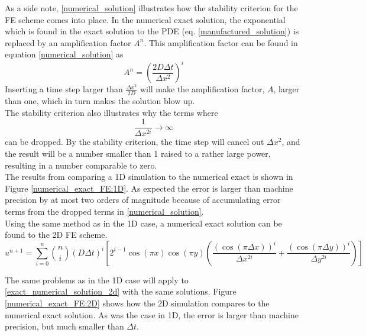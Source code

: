 As a side note, \eqref{numerical_solution} illustrates how the stability criterion for the FE scheme comes into place. 
In the numerical exact solution, the exponential which is found in the exact solution to the PDE (eq. \ref{manufactured_solution}) is replaced by an amplification factor $A^n$.
This amplification factor can be found in equation \eqref{numerical_solution} as 
\begin{equation}
A^n = \left(\frac{2D\Delta t}{\Delta x^2}\right)^i
\end{equation}
Inserting a time step larger than $\frac{\Delta x^2}{2D}$ will make the amplification factor, $A$, larger than one, which in turn makes the solution blow up. \\

\noindent The stability criterion also illustrates why the terms where 
$$ \frac{1}{\Delta x^{2i}} \to \infty$$
 can be dropped. 
 By the stability criterion, the time step will cancel out $\Delta x^2$, and the result will be a number smaller than 1 raised to a rather large power, resulting in a number comparable to zero.\\
 
 The results from comparing a 1D simulation to the numerical exact is shown in Figure \ref{numerical_exact_FE:1D}. 
 As expected the error is larger than machine precision by at most two orders of magnitude because of accumulating error terms from the dropped terms in \eqref{numerical_solution}.\\
 
\noindent Using the same method as in the 1D case, a numerical exact solution can be found to the 2D FE scheme. 
 \begin{equation}\label{exact_numerical_solution_2d}
 u^{n+1} = \sum\limits^n_{i=0}{n\choose i}\left(D\Delta t\right)^i\left[2^{i-1}\cos(\pi x)\cos(\pi y)\left(\frac{(\cos(\pi\Delta x))^i}{\Delta x^{2i}} +\frac{(\cos(\pi\Delta y))^i}{\Delta y^{2i}}\right)\right]
\end{equation}

The same problems as in the 1D case will apply to \eqref{exact_numerical_solution_2d} with the same solutions. 
Figure \ref{numerical_exact_FE:2D} shows how the 2D simulation compares to the numerical exact solution. 
As was the case in 1D, the error is larger than machine precision, but much smaller than $\Delta t$.

